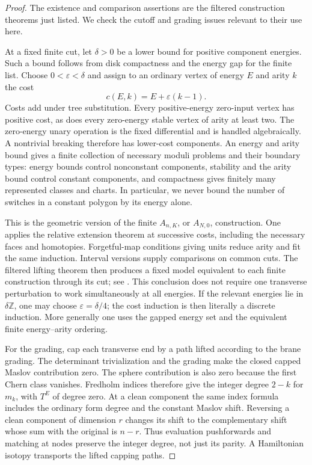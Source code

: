 \documentclass[11pt]{article}
\numberwithin{equation}{section}
\theoremstyle{definition}
\theoremstyle{remark}
\begin{document}
\begin{proof}
The existence and comparison assertions are the filtered construction
theorems just listed.  We check the cutoff and grading issues relevant to
their use here.

At a fixed finite cut, let $\delta>0$ be a lower bound for positive
component energies.  Such a bound follows from disk compactness and the
energy gap for the finite list.  Choose $0<\varepsilon<\delta$ and assign
to an ordinary vertex of energy $E$ and arity $k$ the cost
\begin{equation}
 \label{eq:floer-cost}
 c(E,k)=E+\varepsilon(k-1).
\end{equation}
Costs add under tree substitution.  Every positive-energy zero-input
vertex has positive cost, as does every zero-energy stable vertex of
arity at least two.  The zero-energy unary operation is the fixed
differential and is handled algebraically.  A nontrivial breaking
therefore has lower-cost components.  An energy and arity bound gives
a finite collection of necessary moduli problems and their boundary
types: energy bounds control nonconstant components, stability and the
arity bound control constant components, and compactness gives finitely
many represented classes and charts.  In particular, we never bound the
number of switches in a constant polygon by its energy alone.

This is the geometric version of the finite $A_{n,K}$, or $A_{N,0}$,
construction.  One applies the relative extension theorem at successive
costs, including the necessary faces and homotopies.  Forgetful-map
conditions giving units reduce arity and fit the same induction.
Interval versions supply comparisons on common cuts.  The filtered
lifting theorem then produces a fixed model equivalent to each finite
construction through its cut; see
\cite[Sections~7--11]{Floer:AJ}.  This conclusion does not require one
transverse perturbation to work simultaneously at all energies.  If
the relevant energies lie in $\delta\mathbb Z$, one may choose
$\varepsilon=\delta/4$; the cost induction is then literally a discrete
induction.  More generally one uses the gapped energy set and the
equivalent finite energy--arity ordering.

For the grading, cap each transverse end by a path lifted according to
the brane grading.  The determinant trivialization and the grading make
the closed capped Maslov contribution zero.  The sphere contribution is
also zero because the first Chern class vanishes.  Fredholm indices
therefore give the integer degree $2-k$ for $m_k$, with $T^E$ of degree
zero.  At a clean component the same index formula includes the ordinary
form degree and the constant Maslov shift.  Reversing a clean component
of dimension $r$ changes its shift to the complementary shift whose sum
with the original is $n-r$.  Thus evaluation pushforwards and matching
at nodes preserve the integer degree, not just its parity.  A
Hamiltonian isotopy transports the lifted capping paths.


\end{proof}
\end{document}
